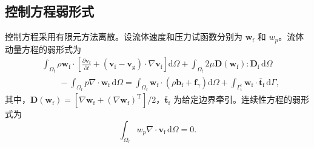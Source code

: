 \subsection{控制方程弱形式}

控制方程采用有限元方法离散。设流体速度和压力试函数分别为 $\boldsymbol{w}_{\mathrm f}$ 和 $w_p$。流体动量方程的弱形式为
\begin{equation}
\begin{aligned}
&\int_{\Omega_{\mathrm f}}
\rho\boldsymbol{w}_{\mathrm f}\cdot
\left[
\frac{\partial\boldsymbol{v}_{\mathrm f}}{\partial t}
+
\left(\boldsymbol{v}_{\mathrm f}-\boldsymbol{v}_{\mathrm g}\right)
\cdot\nabla\boldsymbol{v}_{\mathrm f}
\right]
\mathrm d\Omega
+
\int_{\Omega_{\mathrm f}}
2\mu\boldsymbol{D}(\boldsymbol{w}_{\mathrm f}):\boldsymbol{D}_{\mathrm f}
\,\mathrm d\Omega
\\
&\qquad
-
\int_{\Omega_{\mathrm f}}
p\nabla\cdot\boldsymbol{w}_{\mathrm f}
\,\mathrm d\Omega
=
\int_{\Omega_{\mathrm f}}
\boldsymbol{w}_{\mathrm f}\cdot
\left(\rho\boldsymbol{b}_{\mathrm f}+\boldsymbol{f}_{\gamma}\right)
\mathrm d\Omega
+
\int_{\Gamma_{\mathrm t}^{\mathrm f}}
\boldsymbol{w}_{\mathrm f}\cdot\bar{\boldsymbol{t}}_{\mathrm f}
\,\mathrm d\Gamma,
\label{eq:ch2_weak_fluid_momentum}
\end{aligned}
\end{equation}
其中，$\boldsymbol{D}(\boldsymbol{w}_{\mathrm f})=[\nabla\boldsymbol{w}_{\mathrm f}+(\nabla\boldsymbol{w}_{\mathrm f})^{\mathrm T}]/2$，$\bar{\boldsymbol{t}}_{\mathrm f}$ 为给定边界牵引。连续性方程的弱形式为
\begin{equation}
\int_{\Omega_{\mathrm f}}
w_p\nabla\cdot\boldsymbol{v}_{\mathrm f}
\,\mathrm d\Omega
=0.
\label{eq:ch2_weak_continuity}
\end{equation}

